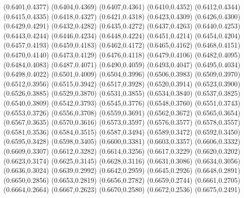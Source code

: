 \PST@Cross(0.6401,0.4377)
\PST@Cross(0.6404,0.4369)
\PST@Cross(0.6407,0.4361)
\PST@Cross(0.6410,0.4352)
\PST@Cross(0.6412,0.4344)
\PST@Cross(0.6415,0.4335)
\PST@Cross(0.6418,0.4327)
\PST@Cross(0.6421,0.4318)
\PST@Cross(0.6423,0.4309)
\PST@Cross(0.6426,0.4300)
\PST@Cross(0.6429,0.4291)
\PST@Cross(0.6432,0.4282)
\PST@Cross(0.6435,0.4272)
\PST@Cross(0.6437,0.4263)
\PST@Cross(0.6440,0.4253)
\PST@Cross(0.6443,0.4244)
\PST@Cross(0.6446,0.4234)
\PST@Cross(0.6448,0.4224)
\PST@Cross(0.6451,0.4214)
\PST@Cross(0.6454,0.4204)
\PST@Cross(0.6457,0.4193)
\PST@Cross(0.6459,0.4183)
\PST@Cross(0.6462,0.4172)
\PST@Cross(0.6465,0.4162)
\PST@Cross(0.6468,0.4151)
\PST@Cross(0.6470,0.4140)
\PST@Cross(0.6473,0.4129)
\PST@Cross(0.6476,0.4118)
\PST@Cross(0.6479,0.4106)
\PST@Cross(0.6482,0.4095)
\PST@Cross(0.6484,0.4083)
\PST@Cross(0.6487,0.4071)
\PST@Cross(0.6490,0.4059)
\PST@Cross(0.6493,0.4047)
\PST@Cross(0.6495,0.4034)
\PST@Cross(0.6498,0.4022)
\PST@Cross(0.6501,0.4009)
\PST@Cross(0.6504,0.3996)
\PST@Cross(0.6506,0.3983)
\PST@Cross(0.6509,0.3970)
\PST@Cross(0.6512,0.3956)
\PST@Cross(0.6515,0.3942)
\PST@Cross(0.6517,0.3928)
\PST@Cross(0.6520,0.3914)
\PST@Cross(0.6523,0.3900)
\PST@Cross(0.6526,0.3885)
\PST@Cross(0.6529,0.3870)
\PST@Cross(0.6531,0.3855)
\PST@Cross(0.6534,0.3840)
\PST@Cross(0.6537,0.3825)
\PST@Cross(0.6540,0.3809)
\PST@Cross(0.6542,0.3793)
\PST@Cross(0.6545,0.3776)
\PST@Cross(0.6548,0.3760)
\PST@Cross(0.6551,0.3743)
\PST@Cross(0.6553,0.3726)
\PST@Cross(0.6556,0.3708)
\PST@Cross(0.6559,0.3691)
\PST@Cross(0.6562,0.3672)
\PST@Cross(0.6565,0.3654)
\PST@Cross(0.6567,0.3635)
\PST@Cross(0.6570,0.3616)
\PST@Cross(0.6573,0.3597)
\PST@Cross(0.6576,0.3577)
\PST@Cross(0.6578,0.3557)
\PST@Cross(0.6581,0.3536)
\PST@Cross(0.6584,0.3515)
\PST@Cross(0.6587,0.3494)
\PST@Cross(0.6589,0.3472)
\PST@Cross(0.6592,0.3450)
\PST@Cross(0.6595,0.3428)
\PST@Cross(0.6598,0.3405)
\PST@Cross(0.6600,0.3381)
\PST@Cross(0.6603,0.3357)
\PST@Cross(0.6606,0.3332)
\PST@Cross(0.6609,0.3307)
\PST@Cross(0.6612,0.3282)
\PST@Cross(0.6614,0.3256)
\PST@Cross(0.6617,0.3229)
\PST@Cross(0.6620,0.3202)
\PST@Cross(0.6623,0.3174)
\PST@Cross(0.6625,0.3145)
\PST@Cross(0.6628,0.3116)
\PST@Cross(0.6631,0.3086)
\PST@Cross(0.6634,0.3056)
\PST@Cross(0.6636,0.3024)
\PST@Cross(0.6639,0.2992)
\PST@Cross(0.6642,0.2959)
\PST@Cross(0.6645,0.2926)
\PST@Cross(0.6648,0.2891)
\PST@Cross(0.6650,0.2856)
\PST@Cross(0.6653,0.2819)
\PST@Cross(0.6656,0.2782)
\PST@Cross(0.6659,0.2744)
\PST@Cross(0.6661,0.2705)
\PST@Cross(0.6664,0.2664)
\PST@Cross(0.6667,0.2623)
\PST@Cross(0.6670,0.2580)
\PST@Cross(0.6672,0.2536)
\PST@Cross(0.6675,0.2491)
